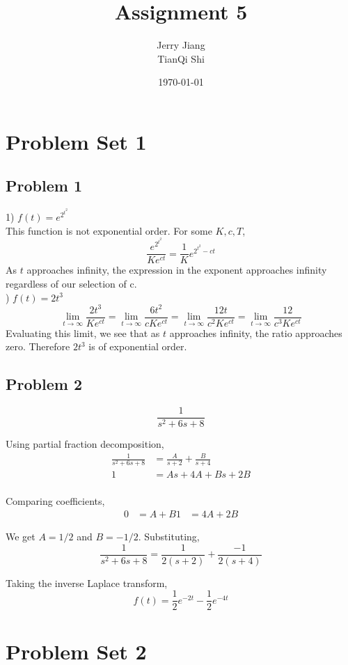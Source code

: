 \documentclass[titlepage]{article}
\title{Assignment 5}
\date{\today}
\author{Jerry Jiang\\ TianQi Shi}
\begin{document}
\maketitle

\noindent
\section{Problem Set 1}
\subsection{Problem 1}
1) $f(t) = e^{2^{t^2}}$ \\
This function is not exponential order. For some $K, c, T$,
$$\frac{e^{2^{t^2}}}{Ke^{ct}} = \frac{1}{K}e^{2^{t^2} - ct}$$
As $t$ approaches infinity, the expression in the exponent approaches infinity regardless of our selection of c.\\

) $f(t) = 2t^3$ \\
$$\lim_{t\to\infty} \frac{2t^3}{Ke^{ct}} = \lim_{t\to\infty} \frac{6t^2}{cKe^{ct}} = \lim_{t\to\infty} \frac{12t}{c^2Ke^{ct}} = \lim_{t\to\infty} \frac{12}{c^3Ke^{ct}}$$
Evaluating this limit, we see that as $t$ approaches infinity, the ratio approaches zero. Therefore $2t^3$ is of exponential order.

\subsection{Problem 2}
$$\frac{1}{s^2 + 6s + 8}$$

Using partial fraction decomposition,
\begin{align*}
  \frac{1}{s^2 + 6s + 8} &= \frac{A}{s+2} + \frac{B}{s+4} \\
  1 &= As + 4A + Bs + 2B \\
\end{align*}

Comparing coefficients,
\begin{align*}
  0 &= A + B
  1 &= 4A + 2B
\end{align*}

We get $A = 1/2$ and $B = -1/2$. Substituting,
$$\frac{1}{s^2 + 6s + 8} = \frac{1}{2(s+2)} + \frac{-1}{2(s+4)}$$

Taking the inverse Laplace transform,
$$f(t) = \frac{1}{2}e^{-2t} - \frac{1}{2}e^{-4t}$$

\section{Problem Set 2}
\end{document}
